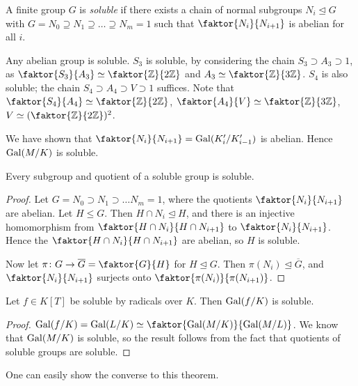 \begin{definition}
	A finite group \( G \) is \emph{soluble} if there exists a chain of normal subgroups \( N_i \trianglelefteq G \) with \( G = N_0 \supseteq N_1 \supseteq \dots \supseteq N_m = {1} \) such that \( \faktor{N_i}{N_{i+1}} \) is abelian for all \( i \).
\end{definition}
\begin{example}
	Any abelian group is soluble.
	\( S_3 \) is soluble, by considering the chain \( S_3 \supset A_3 \supset {1} \), as \( \faktor{S_3}{A_3} \simeq \faktor{\mathbb Z}{2\mathbb Z} \) and \( A_3 \simeq \faktor{\mathbb Z}{3\mathbb Z} \).
	\( S_4 \) is also soluble; the chain \( S_4 \supset A_4 \supset V \supset {1} \) suffices.
	Note that \( \faktor{S_4}{A_4} \simeq \faktor{\mathbb Z}{2\mathbb Z} \), \( \faktor{A_4}{V} \simeq \faktor{\mathbb Z}{3\mathbb Z} \), \( V \simeq (\faktor{\mathbb Z}{2\mathbb Z})^2 \).
\end{example}
We have shown that \( \faktor{N_i}{N_{i+1}} = \Gal(K_i'/K_{i-1}') \) is abelian.
Hence \( \operatorname{Gal}(M/K) \) is soluble.
\begin{lemma}
	Every subgroup and quotient of a soluble group is soluble.
\end{lemma}
\begin{proof}
	Let \( G = N_0 \supset N_1 \supset \dots N_m = {1} \), where the quotients \( \faktor{N_i}{N_{i+1}} \) are abelian.
	Let \( H \leq G \).
	Then \( H \cap N_i \trianglelefteq H \), and there is an injective homomorphism from \( \faktor{H \cap N_i}{H \cap N_{i+1}} \) to \( \faktor{N_i}{N_{i+1}} \).
	Hence the \( \faktor{H \cap N_i}{H \cap N_{i+1}} \) are abelian, so \( H \) is soluble.

	Now let \( \pi \colon G \to \overline G = \faktor{G}{H} \) for \( H \trianglelefteq G \).
	Then \( \pi(N_i) \trianglelefteq \overline G \), and \( \faktor{N_i}{N_{i+1}} \) surjects onto \( \faktor{\pi(N_i)}{\pi(N_{i+1})} \).
\end{proof}
\begin{theorem}
	Let \( f \in K[T] \) be soluble by radicals over \( K \).
	Then \( \operatorname{Gal}(f/K) \) is soluble.
\end{theorem}
\begin{proof}
	\( \Gal(f/K) = \Gal(L/K) \simeq \faktor{\Gal(M/K)}{\Gal(M/L)} \).
	We know that \( \operatorname{Gal}(M/K) \) is soluble, so the result follows from the fact that quotients of soluble groups are soluble.
\end{proof}
\begin{remark}
	One can easily show the converse to this theorem.
\end{remark}
